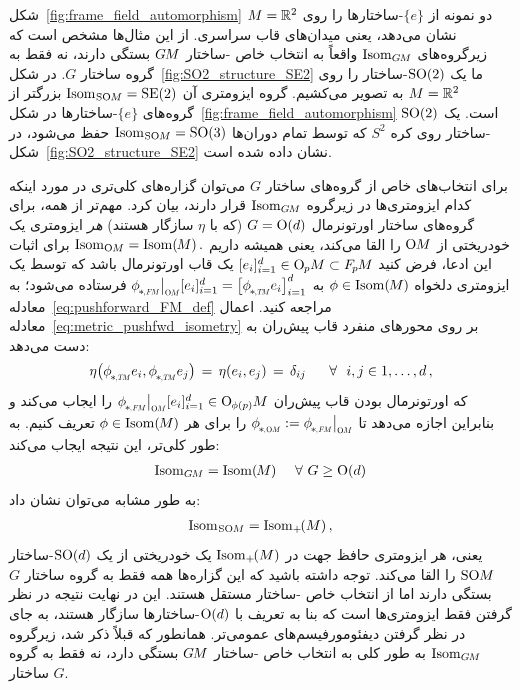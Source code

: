 شکل~\ref{fig:frame_field_automorphism} دو نمونه از $\{e\}$-ساختارها را روی $M=\mathbb{R}^2$ نشان می‌دهد، یعنی میدان‌های قاب سراسری.
از این مثال‌ها مشخص است که زیرگروه‌های $\operatorname{Isom}_{G\mkern-1.4muM}$ واقعاً به انتخاب خاص -ساختار $G\mkern-1.4muM$ بستگی دارند، نه فقط به گروه ساختار $G$.
در شکل~\ref{fig:SO2_structure_SE2} ما یک $\operatorname{SO}(2)$-ساختار را روی $M=\mathbb{R}^2$ به تصویر می‌کشیم.
گروه ایزومتری آن $\operatorname{Isom}_{\mkern1mu\operatorname{SO}\mkern-3.6muM} = \operatorname{SE}(2)$ بزرگتر از گروه‌های $\{e\}$-ساختارها در شکل~\ref{fig:frame_field_automorphism} است.
یک $\operatorname{SO}(2)$-ساختار روی کره $S^2$ که توسط تمام دوران‌ها $\operatorname{Isom}_{\mkern1mu\operatorname{SO}\mkern-3.6muM} = \operatorname{SO}(3)$ حفظ می‌شود، در شکل~\ref{fig:SO2_structure_SE2} نشان داده شده است.


برای انتخاب‌های خاص از گروه‌های ساختار $G$ می‌توان گزاره‌های کلی‌تری در مورد اینکه کدام ایزومتری‌ها در زیرگروه $\operatorname{Isom}_{G\mkern-1.4muM}$ قرار دارند، بیان کرد.
مهم‌تر از همه، برای گروه‌های ساختار اورتونرمال $G=\operatorname{O}(d)$ (که با $\eta$ سازگار هستند) \emph{هر} ایزومتری یک خودریختی از $\operatorname{O}\mkern-3.6muM$ را القا می‌کند، یعنی همیشه داریم $\operatorname{Isom}_{\operatorname{O}\mkern-3.6muM} = \operatorname{Isom}(\mkern-1.5mu M \mkern-.5mu) \,.$
برای اثبات این ادعا، فرض کنید $[e_i]_{i=1}^d \in \operatorname{O}_{\mkern-1.1mu p}\mkern-3.4muM \subset F_{\mkern-1.5mu p}\mkern-1.0muM$ یک قاب اورتونرمال باشد که توسط یک ایزومتری دلخواه $\phi \in \operatorname{Isom}(\mkern-1.5mu M \mkern-.5mu)$ به $\dphiFM \big|_{\scalebox{.58}{$\OM$}} [e_i]_{i=1}^d = \big[\dphiTM e_i\big]_{i=1}^d$ فرستاده می‌شود؛ به معادله~\eqref{eq:pushforward_FM_def} مراجعه کنید.
اعمال معادله~\eqref{eq:metric_pushfwd_isometry} بر روی محورهای منفرد قاب پیش‌ران به دست می‌دهد:
\begin{align}\label{eq:isom_orthonormal_to_orthonormal_frames}
    \eta\big( \dphiTM e_i, \dphiTM e_j \big) \,=\, \eta(e_i, e_j) \,=\, \delta_{ij}\ \quad\ \forall\ \ i,j \in 1,\dots,d \,,
\end{align}
که اورتونرمال بودن قاب پیش‌ران $\dphiFM \big|_{\scalebox{.58}{$\OM$}} [e_i]_{i=1}^d \in \OphipM$ را ایجاب می‌کند و بنابراین اجازه می‌دهد تا $\dphiOM := \dphiFM \big|_{\scalebox{.58}{$\OM$}}$ را برای هر $\phi \in \operatorname{Isom}(\mkern-1.5mu M \mkern-.5mu)$ تعریف کنیم.
به طور کلی‌تر، این نتیجه ایجاب می‌کند:
\begin{align}\label{eq:isomM_isomOM}
    \operatorname{Isom}_{G\mkern-1.4muM} = \operatorname{Isom}(\mkern-1.5mu M \mkern-.5mu) \quad \ \forall\ G \geq \operatorname{O}(d)
\end{align}
به طور مشابه می‌توان نشان داد:
\begin{align}\label{eq:isomplusM_isomSOM}
    \operatorname{Isom}_{\mkern1mu\operatorname{SO}\mkern-3.6muM} = \operatorname{Isom}_+\mkern-2mu(M) \,,
\end{align}
یعنی، هر ایزومتری حافظ جهت در $\operatorname{Isom}_+\mkern-2mu(M)$ یک خودریختی از یک $\operatorname{SO}(d)$-ساختار $\operatorname{SO}\mkern-3.6muM$ را القا می‌کند.
توجه داشته باشید که این گزاره‌ها همه فقط به گروه ساختار $G$ بستگی دارند اما از انتخاب خاص -ساختار مستقل هستند.
این در نهایت نتیجه در نظر گرفتن فقط ایزومتری‌ها است که بنا به تعریف با $\operatorname{O}(d)$-ساختارها سازگار هستند، به جای در نظر گرفتن دیفئومورفیسم‌های عمومی‌تر.
همانطور که قبلاً ذکر شد، زیرگروه $\operatorname{Isom}_{G\mkern-1.4muM}$ به طور کلی به انتخاب خاص -ساختار $G\mkern-1.4muM$ بستگی دارد، نه فقط به گروه ساختار $G$.


